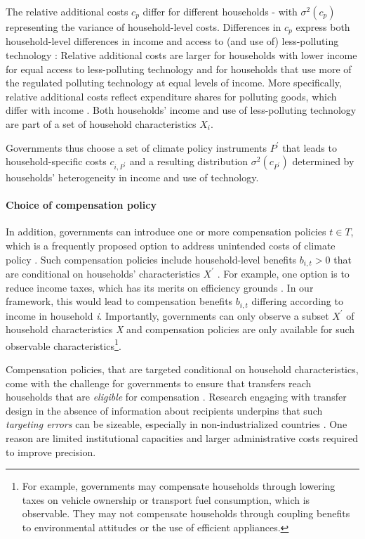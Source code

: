\documentclass[12pt, a4paper]{article}
\begin{document}
The relative additional costs $c_{p}$ differ for different households - with $\sigma^{2}(c_{p})$ representing the variance of household-level costs. Differences in $c_{p}$ express both household-level differences in income and access to (and use of) less-polluting technology \autocite{Hansel.2022}: Relative additional costs are larger for households with lower income for equal access to less-polluting technology and for households that use more of the regulated polluting technology at equal levels of income. More specifically, relative additional costs reflect expenditure shares for polluting goods, which differ with income \autocite{Jacobs.2019,Dorband.2019}. Both households' income and use of less-polluting technology are part of a set of household characteristics $X_{i}$. 

Governments thus choose a set of climate policy instruments $P^{\prime}$ that leads to household-specific costs $c_{i,P^{\prime}}$ and a resulting distribution $\sigma^{2}(c_{P^{\prime}})$ determined by households' heterogeneity in income and use of technology.

\paragraph{Choice of compensation policy}
In addition, governments can introduce one or more compensation policies $t \in T$, which is a frequently proposed option to address unintended costs of climate policy \autocite{Klenert.2018,Baranzini.2017}. Such compensation policies include household-level benefits $b_{i,t}>0$ that are conditional on households' characteristics $X^{\prime}$ \autocite[e.g.,][]{Akerlof.1978}. For example, one option is to reduce income taxes, which has its merits on efficiency grounds \autocite{Pearce.1991,Goulder.1995,Bento.2018}. In our framework, this would lead to compensation benefits $b_{i,t}$ differing according to income in household \textit{i}. Importantly, governments can only observe a subset $X^{\prime}$ of household characteristics \textit{X} and compensation policies are only available for such observable characteristics\footnote{For example, governments may compensate households through lowering taxes on vehicle ownership or transport fuel consumption, which is observable. They may not compensate households through coupling benefits to environmental attitudes or the use of efficient appliances.}. 

Compensation policies, that are targeted conditional on household characteristics, come with the challenge for governments to ensure that transfers reach households that are \textit{eligible} for compensation \autocite[e.g.,][]{Hanna.2018}. Research engaging with transfer design in the absence of information about recipients underpins that such \textit{targeting errors} can be sizeable, especially in non-industrialized countries \autocite{WorldBank.2018, Robles.2019}. One reason are limited institutional capacities \autocite[e.g.,][]{Besley.2009} and larger administrative costs \autocite{Coady.2004} required to improve precision.
\end{document}
